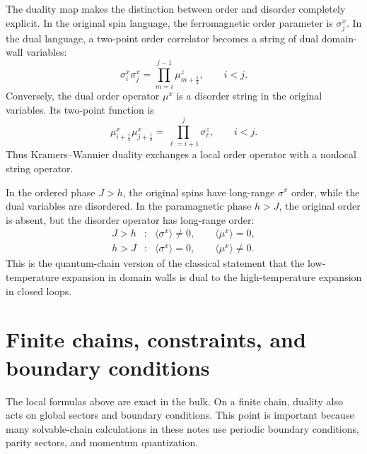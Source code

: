 The duality map makes the distinction between order and disorder completely
explicit.  In the original spin language, the ferromagnetic order parameter is
$\sigma_j^x$.  In the dual language, a two-point order correlator becomes a
string of dual domain-wall variables:
\begin{equation}
\label{eq:duality-order-correlator-string}
    \sigma_i^x\sigma_j^x
    =
    \prod_{m=i}^{j-1}
    \mu_{m+\frac12}^z,
    \qquad i<j .
\end{equation}
Conversely, the dual order operator $\mu^x$ is a disorder string in the original
variables.  Its two-point function is
\begin{equation}
\label{eq:duality-disorder-correlator-string}
    \mu_{i+\frac12}^x\mu_{j+\frac12}^x
    =
    \prod_{\ell=i+1}^{j}\sigma_\ell^z,
    \qquad i<j .
\end{equation}
Thus Kramers--Wannier duality exchanges a local order operator with a nonlocal
string operator.

In the ordered phase $J>h$, the original spins have long-range $\sigma^x$ order,
while the dual variables are disordered.  In the paramagnetic phase $h>J$, the
original order is absent, but the disorder operator has long-range order:
\begin{equation}
\label{eq:duality-order-disorder-phases}
    \begin{array}{ccl}
    J>h &:& \langle \sigma^x\rangle\neq0,
    \qquad \langle \mu^x\rangle=0,\\[2pt]
    h>J &:& \langle \sigma^x\rangle=0,
    \qquad \langle \mu^x\rangle\neq0 .
    \end{array}
\end{equation}
This is the quantum-chain version of the classical statement that the low-
temperature expansion in domain walls is dual to the high-temperature expansion
in closed loops.

\section{Finite chains, constraints, and boundary conditions}
\label{sec:duality-boundary-conditions}

The local formulas above are exact in the bulk.  On a finite chain, duality also
acts on global sectors and boundary conditions.  This point is important because
many solvable-chain calculations in these notes use periodic boundary
conditions, parity sectors, and momentum quantization.

